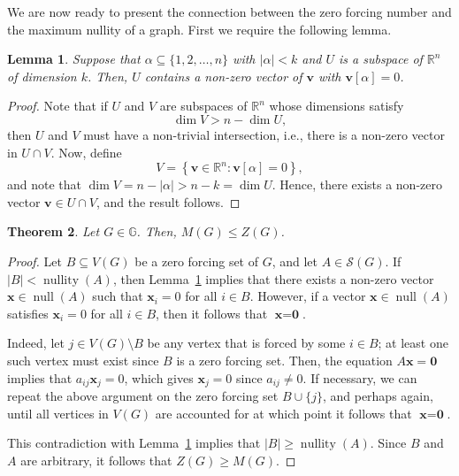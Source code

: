 \documentclass{article}
\newtheorem{theorem}{Theorem}[section]
\newtheorem{lemma}[theorem]{Lemma}
\theoremstyle{definition}
\newcommand\abs[1]{\left|#1\right|}
\newcommand\nullity[1]{\operatorname{nullity}\left(#1\right)}
\newcommand\kernel[1]{\operatorname{null}\left(#1\right)}
\begin{document}
We are now ready to present the connection between the zero forcing number and the maximum nullity of a graph.
First we require the following lemma. 
\begin{lemma}\label{lem:non-zero-int}
Suppose that $\alpha\subseteq\{1,2,\ldots,n\}$ with $\abs{\alpha}<k$ and $U$ is a subspace of $\mathbb{R}^{n}$ of dimension $k$.
Then, $U$ contains a non-zero vector of $\textbf{v}$ with $\textbf{v}[\alpha] = 0$.
\end{lemma}
\begin{proof}
Note that if $U$ and $V$ are subspaces of $\mathbb{R}^{n}$ whose dimensions satisfy
\[
\dim{V} > n - \dim{U},
\]
then $U$ and $V$ must have a non-trivial intersection, i.e., there is a non-zero vector in $U\cap V$.
Now, define
\[
V = \left\{\textbf{v}\in\mathbb{R}^{n}\colon \textbf{v}[\alpha] = 0\right\},
\]
and note that $\dim{V} = n - \abs{\alpha} > n - k = \dim{U}$.
Hence, there exists a non-zero vector $\textbf{v}\in U\cap V$, and the result follows.
\end{proof}

\begin{theorem}\label{thm:max-nul-zero-forcing}
Let $G\in\mathbb{G}$.
Then, $M(G)\leq Z(G)$.
\end{theorem}
\begin{proof}
Let $B\subseteq V(G)$ be a zero forcing set of $G$, and let $A\in\mathcal{S}(G)$.
If $\abs{B}<\nullity{A}$, then Lemma~\ref{lem:non-zero-int} implies that there exists a non-zero vector $\textbf{x}\in\kernel{A}$ such that $\textbf{x}_{i}=0$ for all $i\in B$.
However, if a vector $\textbf{x}\in\kernel{A}$ satisfies $\textbf{x}_{i}=0$ for all $i\in B$, then it follows that $\textbf{x}=\textbf{0}$.

Indeed, let $j\in V(G)\setminus{B}$ be any vertex that is forced by some $i\in B$; at least one such vertex must exist since $B$ is a zero forcing set.
Then, the equation $A\textbf{x}=\textbf{0}$ implies that $a_{ij}\textbf{x}_{j}=0$, which gives $\textbf{x}_{j}=0$ since $a_{ij}\neq 0$.
If necessary, we can repeat the above argument on the zero forcing set $B\cup\{j\}$, and perhaps again, until all vertices in $V(G)$ are accounted for at which point it follows that $\textbf{x}=\textbf{0}$.

This contradiction with Lemma~\ref{lem:non-zero-int} implies that $\abs{B}\geq\nullity{A}$.
Since $B$ and $A$ are arbitrary, it follows that $Z(G)\geq M(G)$.
\end{proof}
\end{document}
